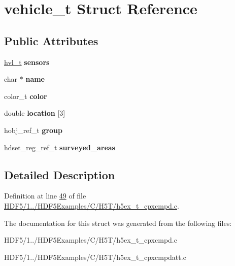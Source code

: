 \hypertarget{structvehicle__t}{}\section{vehicle\+\_\+t Struct Reference}
\label{structvehicle__t}
\subsection*{Public Attributes}
\begin{DoxyCompactItemize}
\item 
\mbox{\label{structvehicle__t_a311249a92c3163e8dffb89514f516222}} 
\hyperlink{structhvl__t}{hvl\+\_\+t} {\bfseries sensors}
\item 
\mbox{\label{structvehicle__t_a74885618d74c1bc36fdd7d6bee867850}} 
char $\ast$ {\bfseries name}
\item 
\mbox{\label{structvehicle__t_ac8af139d93f14303674b9124e0a4233c}} 
color\+\_\+t {\bfseries color}
\item 
\mbox{\label{structvehicle__t_a1f5557ed800b87348d90939adc509b86}} 
double {\bfseries location} \mbox{[}3\mbox{]}
\item 
\mbox{\label{structvehicle__t_affba121a1b6f4e0e225400ed2c042157}} 
hobj\+\_\+ref\+\_\+t {\bfseries group}
\item 
\mbox{\label{structvehicle__t_a8d03fbbbc87847337e06a520676649e4}} 
hdset\+\_\+reg\+\_\+ref\+\_\+t {\bfseries surveyed\+\_\+areas}
\end{DoxyCompactItemize}


\subsection{Detailed Description}


Definition at line \hyperlink{_h_d_f5_21_810_81_2_h_d_f5_examples_2_c_2_h5_t_2h5ex__t__cpxcmpd_8c_source_l00049}{49} of file \hyperlink{_h_d_f5_21_810_81_2_h_d_f5_examples_2_c_2_h5_t_2h5ex__t__cpxcmpd_8c_source}{H\+D\+F5/1../\+H\+D\+F5\+Examples/\+C/\+H5\+T/h5ex\+\_\+t\+\_\+cpxcmpd.\+c}.



The documentation for this struct was generated from the following files\+:\begin{DoxyCompactItemize}
\item 
H\+D\+F5/1../\+H\+D\+F5\+Examples/\+C/\+H5\+T/h5ex\+\_\+t\+\_\+cpxcmpd.\+c\item 
H\+D\+F5/1../\+H\+D\+F5\+Examples/\+C/\+H5\+T/h5ex\+\_\+t\+\_\+cpxcmpdatt.\+c\end{DoxyCompactItemize}
